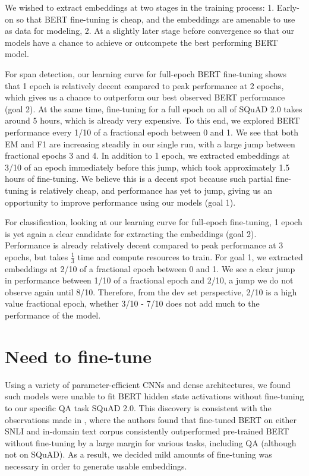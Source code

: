 We wished to extract embeddings at two stages in the training process: 1. Early-on so that BERT fine-tuning is cheap, and the embeddings are amenable to use as data for modeling, 2. At a slightly later stage before convergence so that our models have a chance to achieve or outcompete the best performing BERT model. 

For span detection, our learning curve for full-epoch BERT fine-tuning shows that 1 epoch is relatively decent compared to peak performance at 2 epochs, which gives us a chance to outperform our best observed BERT performance (goal 2). At the same time, fine-tuning for a full epoch on all of SQuAD 2.0 takes around 5 hours, which is already very expensive. To this end, we explored BERT performance every 1/10 of a fractional epoch between 0 and 1. We see that both EM and F1 are increasing steadily in our single run, with a large jump between fractional epochs 3 and 4. In addition to 1 epoch, we extracted embeddings at 3/10 of an epoch immediately before this jump, which took approximately 1.5 hours of fine-tuning. We believe this is a decent spot because such partial fine-tuning is relatively cheap, and performance has yet to jump, giving us an opportunity to improve performance using our models (goal 1).

For classification, looking at our learning curve for full-epoch fine-tuning, 1 epoch is yet again a clear candidate for extracting the embeddings (goal 2). Performance is already relatively decent compared to peak performance at 3 epochs, but takes $\frac{1}{3}$ time and compute resources to train. For goal 1, we extracted embeddings at 2/10 of a fractional epoch between 0 and 1. We see a clear jump in performance between 1/10 of a fractional epoch and 2/10, a jump we do not observe again until 8/10. Therefore, from the dev set perspective, 2/10 is a high value fractional epoch, whether 3/10 - 7/10 does not add much to the performance of the model.

\section{Need to fine-tune}
\label{adpx:need_to_fine_tune}

Using a variety of parameter-efficient CNNs and dense architectures, we found such models were unable to fit BERT hidden state activations without fine-tuning to our specific QA task SQuAD 2.0. This discovery is consistent with the observations made in \cite{ma2019universal}, where the authors found that fine-tuned BERT on either SNLI and in-domain text corpus consistently outperformed pre-trained BERT without fine-tuning by a large margin for various tasks, including QA (although not on SQuAD). As a result, we decided mild amounts of fine-tuning was necessary in order to generate usable embeddings.

